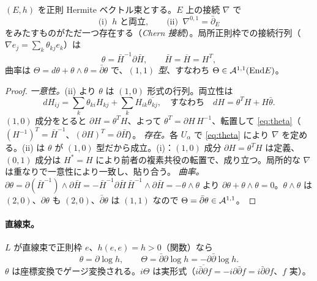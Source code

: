 \begin{thm}[Chern 接続]\label{thm:Chern}\tP
$(E,h)$ を正則 Hermite ベクトル束とする。$E$ 上の接続 $\nabla$ で
\[
\text{(i) }\ h\text{ と両立},\qquad\text{(ii) }\ \nabla^{0,1}=\bar\partial_E
\]
をみたすものがただ一つ存在する（\emph{Chern 接続}）。局所正則枠での接続行列（$\nabla e_j=\sum_k\theta_{kj}e_k$）は
\begin{equation}\label{eq:theta}
\theta=\bar H^{-1}\partial\bar H,\qquad \bar H=\overline{H}=H^{T},
\end{equation}
曲率は $\Theta=d\theta+\theta\wedge\theta=\bar\partial\theta$ で、\emph{$(1,1)$ 型}、すなわち $\Theta\in\mathcal A^{1,1}(\mathrm{End} E)$。
\end{thm}
\begin{proof}
\emph{一意性。}(ii) より $\theta$ は $(1,0)$ 形式の行列。両立性は
\[
dH_{ij}=\sum_k\theta_{ki}H_{kj}+\sum_kH_{ik}\overline{\theta_{kj}},\quad\text{すなわち}\quad dH=\theta^TH+H\bar\theta .
\]
$(1,0)$ 成分をとると $\partial H=\theta^TH$、よって $\theta^T=\partial H\,H^{-1}$、転置して \eqref{eq:theta}（$(H^{-1})^T=\bar H^{-1}$、$(\partial H)^T=\partial\bar H$）。
\emph{存在。}各 $U_\alpha$ で \eqref{eq:theta} により $\nabla$ を定める。(ii) は $\theta$ が $(1,0)$ 型だから成立。(i)：$(1,0)$ 成分 $\partial H=\theta^TH$ は定義、$(0,1)$ 成分は $H^*=H$ により前者の複素共役の転置で、成り立つ。局所的な $\nabla$ は重なりで一意性により一致し、貼り合う。
\emph{曲率。}$\partial\theta=\partial(\bar H^{-1})\wedge\partial\bar H=-\bar H^{-1}\partial\bar H\,\bar H^{-1}\wedge\partial\bar H=-\theta\wedge\theta$ より $\partial\theta+\theta\wedge\theta=0$。$\theta\wedge\theta$ は $(2,0)$、$\partial\theta$ も $(2,0)$、$\bar\partial\theta$ は $(1,1)$ なので $\Theta=\bar\partial\theta\in\mathcal A^{1,1}$。\qedhere
\end{proof}

\paragraph{直線束。}$L$ が直線束で正則枠 $e$、$h(e,e)=h>0$（関数）なら
\begin{equation}\label{eq:linecurv}
\theta=\partial\log h,\qquad\Theta=\bar\partial\partial\log h=-\partial\bar\partial\log h .
\end{equation}
$\theta$ は座標変換でゲージ変換される。$i\Theta$ は実形式（$\overline{i\bar\partial\partial f}=-i\partial\bar\partial f=i\bar\partial\partial f$、$f$ 実）。

